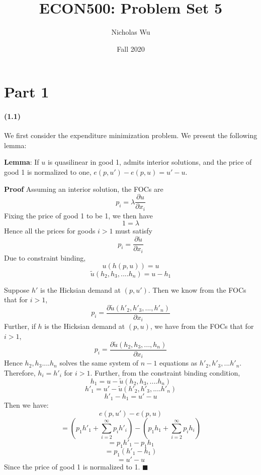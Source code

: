 \documentclass[10pt,letter]{article}
\begin{document}


\title{ECON500: Problem Set 5}

\author{Nicholas Wu}

\date{Fall 2020}

\maketitle


\section*{Part 1}
\paragraph{(1.1)}
We first consider the expenditure minimization problem. We present the following lemma:

\textbf{Lemma}: If $u$ is quasilinear in good 1, admits interior solutions, and the price of good 1 is normalized to one, $e(p, u') - e(p, u) = u' - u$.

\textbf{Proof}
Assuming an interior solution, the FOCs are
\[ p_i = \lambda \frac{\partial u}{\partial x_i} \]
Fixing the price of good 1 to be 1, we then have
\[ 1 = \lambda \]
Hence all the prices for goods $i > 1$ must satisfy
\[ p_i = \frac{\partial \tilde{u}}{\partial x_i} \]
Due to constraint binding,
\[ u(h(p,u)) = u \]
\[ \tilde{u}(h_2, h_3, .... h_n) =  u - h_1 \]

Suppose $h'$ is the Hicksian demand at $(p, u')$. Then we know from the FOCs that for $i > 1$,
\[ p_i = \frac{\partial \tilde{u}(h'_2, h'_3, ... ,h'_n)}{\partial x_i} \]
Further, if $h$ is the Hicksian demand at $(p, u)$, we have from the FOCs that for $i > 1$,
\[ p_i = \frac{\partial \tilde{u}(h_2, h_3, ... ,h_n)}{\partial x_i} \]
Hence $h_2, h_3 .... h_{n}$ solves the same system of $n-1$ equations as $h'_2, h'_3, ... h'_n$. Therefore,
$h_i = h'_i$ for $i > 1$. Further, from the constraint binding condition,
\[  h_1 = u - \tilde{u}(h_2, h_3, .... h_n)\]
\[ h'_1 = u' -\tilde{u}(h'_2, h'_3, .... h'_n) \]
\[ h'_1 - h_1 = u' - u \]
Then we have:
\[ e(p, u') - e(p, u)  \]
\[ = \left( p_1 h'_1 + \sum_{i=2}^\infty p_i h'_i \right) - \left( p_1 h_1 + \sum_{i=2}^\infty p_i h_i \right) \]
\[ = p_1 h'_1 - p_1 h_1 \]
\[ = p_1 (h'_1 - h_1)  \]
\[ = u' - u \]
Since the price of good 1 is normalized to 1. $\blacksquare$
\end{document}
